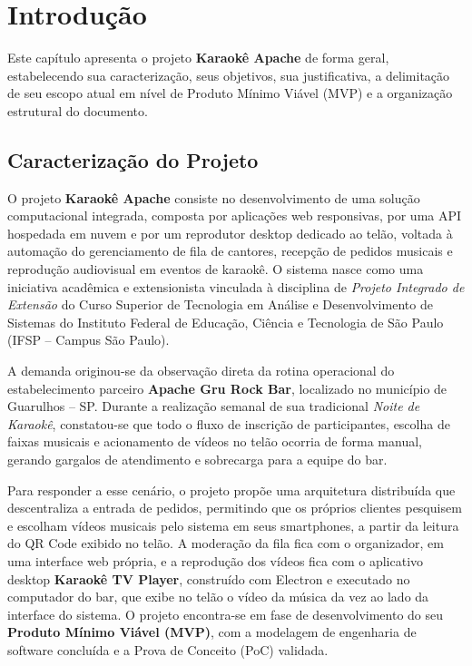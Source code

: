 \chapter{Introdução} \label{cap:introducao}

Este capítulo apresenta o projeto \textbf{Karaokê Apache} de forma geral, estabelecendo sua caracterização, seus objetivos, sua justificativa, a delimitação de seu escopo atual em nível de Produto Mínimo Viável (MVP) e a organização estrutural do documento.

\section{Caracterização do Projeto}

O projeto \textbf{Karaokê Apache} consiste no desenvolvimento de uma solução computacional integrada, composta por aplicações web responsivas, por uma API hospedada em nuvem e por um reprodutor desktop dedicado ao telão, voltada à automação do gerenciamento de fila de cantores, recepção de pedidos musicais e reprodução audiovisual em eventos de karaokê. O sistema nasce como uma iniciativa acadêmica e extensionista vinculada à disciplina de \textit{Projeto Integrado de Extensão} do Curso Superior de Tecnologia em Análise e Desenvolvimento de Sistemas do Instituto Federal de Educação, Ciência e Tecnologia de São Paulo (IFSP -- Campus São Paulo).

A demanda originou-se da observação direta da rotina operacional do estabelecimento parceiro \textbf{Apache Gru Rock Bar}, localizado no município de Guarulhos -- SP. Durante a realização semanal de sua tradicional \textit{Noite de Karaokê}, constatou-se que todo o fluxo de inscrição de participantes, escolha de faixas musicais e acionamento de vídeos no telão ocorria de forma manual, gerando gargalos de atendimento e sobrecarga para a equipe do bar.

Para responder a esse cenário, o projeto propõe uma arquitetura distribuída que descentraliza a entrada de pedidos, permitindo que os próprios clientes pesquisem e escolham vídeos musicais pelo sistema em seus smartphones, a partir da leitura do QR Code exibido no telão. A moderação da fila fica com o organizador, em uma interface web própria, e a reprodução dos vídeos fica com o aplicativo desktop \textbf{Karaokê TV Player}, construído com Electron e executado no computador do bar, que exibe no telão o vídeo da música da vez ao lado da interface do sistema. O projeto encontra-se em fase de desenvolvimento do seu \textbf{Produto Mínimo Viável (MVP)}, com a modelagem de engenharia de software concluída e a Prova de Conceito (PoC) validada.

